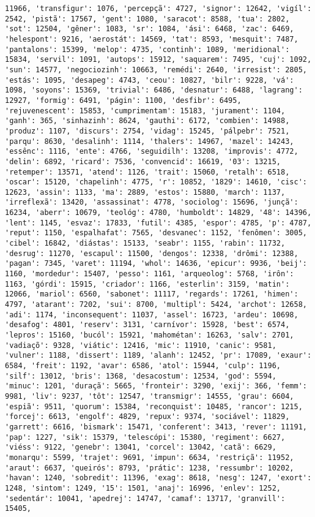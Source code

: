 \begin{Verbatim}[commandchars=\\\{\}]
11966, 'transfigur': 1076, 'percepçã': 4727, 'signor': 12642, 'vigíl': 2542, 'pistã': 17567, 'gent': 1080, 'saracot': 8588, 'tua': 2802, 'sot': 12504, 'gêner': 1083, 'sr': 1084, 'ási': 6468, 'zac': 6469, 'helespont': 9216, 'aerostát': 14569, 'tat': 8593, 'mesquit': 7487, 'pantalons': 15399, 'melop': 4735, 'continh': 1089, 'meridional': 15834, 'servil': 1091, 'autops': 15912, 'saquarem': 7495, 'cuj': 1092, 'sun': 14577, 'negociozinh': 10663, 'remédi': 2640, 'irresist': 2805, 'estás': 1095, 'desapeg': 4743, 'ceou': 10827, 'bilr': 9228, 'vá': 1098, 'soyons': 15369, 'trivial': 6486, 'desnatur': 6488, 'lagrang': 12927, 'formig': 6491, 'págin': 1100, 'desfibr': 6495, 'rejuvenescent': 15853, 'cumprimentam': 15183, 'jurament': 1104, 'ganh': 365, 'sinhazinh': 8624, 'gauthi': 6172, 'combien': 14988, 'produz': 1107, 'discurs': 2754, 'vidag': 15245, 'pálpebr': 7521, 'parqu': 8630, 'desalinh': 1114, 'thalers': 14967, 'mazel': 14243, 'essênc': 1116, 'ente': 4766, 'seguidilh': 13208, 'improvis': 4772, 'delin': 6892, 'ricard': 7536, 'convencid': 16619, '03': 13215, 'retemper': 13571, 'atend': 1126, 'trait': 15060, 'retalh': 6518, 'oscar': 15120, 'chapelinh': 4775, 'r': 10852, '1829': 14610, 'cisc': 12623, 'assin': 1133, 'ma': 2889, 'estos': 15880, 'march': 1137, 'irreflexã': 13420, 'assassinat': 4778, 'sociolog': 15696, 'junçã': 16234, 'aberr': 10679, 'teológ': 4780, 'humboldt': 14829, '48': 14396, 'lent': 1145, 'esvaz': 17833, 'futil': 4385, 'espor': 4785, 'p': 4787, 'reput': 1150, 'espalhafat': 7565, 'desvanec': 1152, 'fenômen': 3005, 'cibel': 16842, 'diástas': 15133, 'seabr': 1155, 'rabin': 11732, 'desrug': 11270, 'escapul': 11500, 'dengos': 12338, 'drômi': 12388, 'pagan': 7345, 'varet': 11194, 'whol': 14636, 'epicur': 9936, 'beij': 1160, 'mordedur': 15407, 'pesso': 1161, 'arqueolog': 5768, 'irôn': 1163, 'górdi': 15915, 'criador': 1166, 'esterlin': 3159, 'matin': 12066, 'mariol': 6560, 'sabonet': 11117, 'regards': 17261, 'himen': 4797, 'atarant': 7202, 'sui': 8700, 'multipl': 5424, 'archot': 12658, 'adi': 1174, 'inconsequent': 11037, 'assel': 16723, 'ardeu': 10698, 'desafog': 4801, 'reserv': 3131, 'carnívor': 15928, 'best': 6574, 'lepros': 15160, 'bucól': 15921, 'mahométan': 16263, 'salv': 2701, 'vadiaçõ': 9328, 'viátic': 12416, 'mic': 11910, 'canic': 9581, 'vulner': 1188, 'dissert': 1189, 'alanh': 12452, 'pr': 17089, 'exaur': 6584, 'freit': 1192, 'avar': 6586, 'atol': 15944, 'culp': 1196, 'silf': 13012, 'bris': 1368, 'desacostum': 12534, 'god': 5594, 'minuc': 1201, 'duraçã': 5665, 'fronteir': 3290, 'exij': 366, 'femm': 9981, 'liv': 9237, 'tôt': 12547, 'transmigr': 14555, 'grau': 6604, 'espiã': 9511, 'quorum': 15384, 'reconquist': 10485, 'rancor': 1215, 'forcej': 6613, 'engolf': 4829, 'repux': 9374, 'sociável': 11829, 'garrett': 6616, 'bismark': 15471, 'conferent': 3413, 'rever': 11191, 'pap': 1227, 'sik': 15379, 'telescópi': 15380, 'regiment': 6627, 'viéss': 9122, 'genebr': 13041, 'corcel': 13042, 'catã': 6629, 'monarqu': 5599, 'trajet': 9691, 'impun': 6634, 'restriçã': 11952, 'araut': 6637, 'queirós': 8793, 'prátic': 1238, 'ressumbr': 10202, 'havan': 1240, 'sobredit': 11396, 'exag': 8618, 'nesg': 1247, 'exort': 1248, 'sintom': 1249, '15': 1501, 'anaj': 16996, 'enlev': 1252, 'sedentár': 10041, 'apedrej': 14747, 'camaf': 13717, 'granvill': 15405, 
\end{Verbatim}
